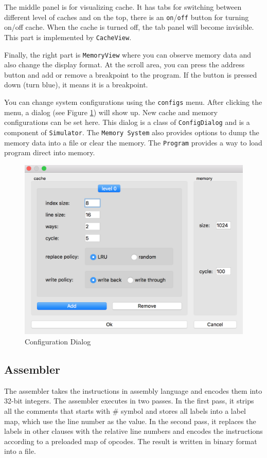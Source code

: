 \documentclass{sig-alternate}
\begin{document}
The middle panel is for visualizing cache. It has tabs for switching between different level of caches and on the top, there is an \texttt{on}/\texttt{off} button for turning on/off cache. When the cache is turned off, the tab panel will become invisible. This part is implemented by \texttt{CacheView}. 

Finally, the right part is \texttt{MemoryView} where you can observe memory data and also change the display format. At the scroll area, you can press the address button and add or remove a breakpoint to the program. If the button is pressed down (turn blue), it means it is a breakpoint. 

You can change system configurations using the \texttt{configs} menu. After clicking the menu, a dialog (see Figure \ref{fig:conf}) will show up. New cache and memory configurations can be set here. This dialog is a class of \texttt{ConfigDialog} and is a component of \texttt{Simulator}. The \texttt{Memory System} also provides options to dump the memory data into a file or clear the memory. The \texttt{Program} provides a way to load program direct into memory. 
\begin{figure}[!ht]
\centering
\includegraphics[width = 0.8\linewidth,keepaspectratio]{config}
\caption{Configuration Dialog}
\label{fig:conf}
\end{figure}

\subsection{Assembler }
The assembler takes the instructions in assembly language and encodes them into 32-bit integers. The assembler executes in two passes. In the first pass, it strips all the comments that starts with $\#$ symbol and stores all labels into a label map, which use the line number as the value. In the second pass, it replaces the labels in other clauses with the relative line numbers and encodes the instructions according to a preloaded map of opcodes. The result is written in binary format into a file. 
\end{document}
